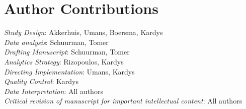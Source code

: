 \section*{Author Contributions}
\noindent \emph{Study Design}: Akkerhuis, Umans, Boersma, Kardys\\
\noindent \emph{Data analysis}: Schuurman, Tomer\\
\noindent \emph{Drafting Manuscript}: Schuurman, Tomer\\
\noindent \emph{Analytics Strategy}: Rizopoulos, Kardys\\
\noindent \emph{Directing Implementation}: Umans, Kardys\\
\noindent \emph{Quality Control}: Kardys\\
\noindent \emph{Data Interpretation}: All authors\\
\noindent \emph{Critical revision of manuscript for important intellectual content}: All authors